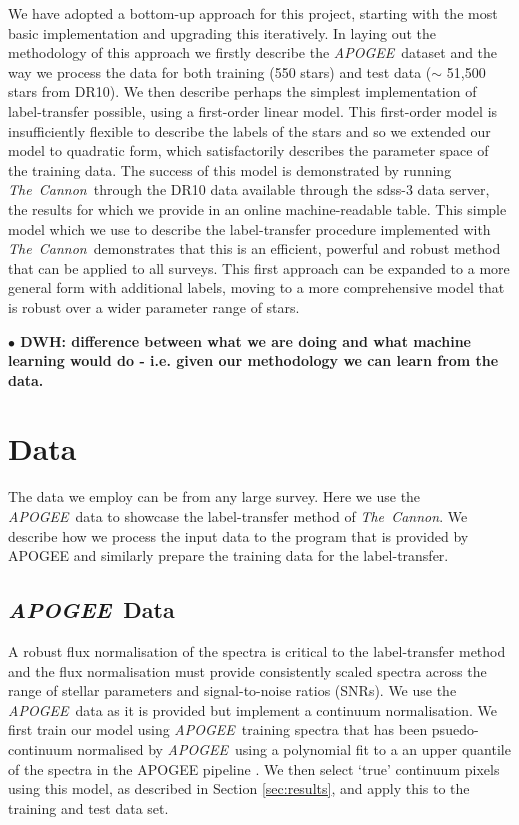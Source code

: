 \documentclass[12pt, preprint]{aastex}
\newcommand{\tc}{\textsl{The~Cannon}}
\newcommand{\apogee}{\textsl{APOGEE}}
\begin{document}
We have adopted a bottom-up approach for this project, starting with the most basic implementation and upgrading this iteratively.  In laying out the methodology of this approach we firstly describe the \apogee\ dataset and the way we process the data for both training (550 stars) and test data ($\sim$ 51,500 stars from DR10). We then describe perhaps the simplest implementation of label-transfer possible, using a first-order linear model. This first-order model is insufficiently flexible to describe the labels of the stars and so we extended our model to quadratic form, which satisfactorily describes the parameter space of the training data. The success of this model is demonstrated by running \tc\ through the DR10 data available through the sdss-3 data server, the results for which we provide in an online machine-readable table. This simple model which we use to describe the label-transfer procedure implemented with  \tc\, demonstrates that this is an efficient, powerful and robust method that can be applied to all surveys. This first approach can be expanded to a more general form with additional labels, moving to a more comprehensive model that is robust over a wider parameter range of stars. 

\textbf{$\bullet$ DWH: difference between what we are doing and what machine learning would do - i.e. given our methodology we can learn from the data. }



\section{Data}

The data we employ can be from any large survey. Here we use the \apogee\ data to showcase the label-transfer method of \tc . We describe how we process the input data to the program that is provided by APOGEE and similarly prepare the training data for the label-transfer. 

\subsection{\apogee\ Data}

A robust flux normalisation of the spectra is critical to the label-transfer method and the flux normalisation must provide consistently scaled spectra across the range of stellar parameters and signal-to-noise ratios (SNRs). We use the \apogee\ data as it is provided but implement a continuum normalisation. We first train our model using \apogee\ training spectra that has been psuedo-continuum normalised by \apogee\ using a polynomial fit to a an upper quantile of the spectra in the APOGEE pipeline \citep{Meszaros2013}. 
We then select  `true' continuum pixels using this model, as described in Section \ref{sec:results}, and apply this to the training and test data set. 
\end{document}
